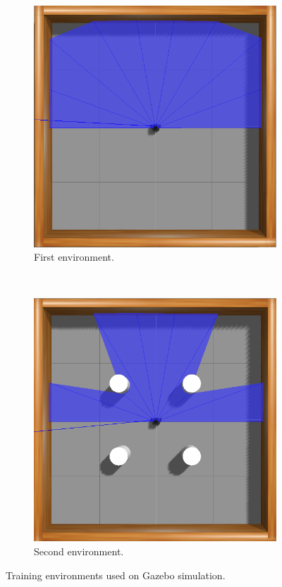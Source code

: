 \begin{figure}[H]
    \centering
    \begin{subfigure}[b]{0.3\textwidth}
        \includegraphics[width=\textwidth]{images/amb1.png}
        \caption{First environment.}
        \label{subfig:env1}
    \end{subfigure}
    ~ %
    \begin{subfigure}[b]{0.3\textwidth}
        \includegraphics[width=\textwidth]{images/amb2.png}
        \caption{Second environment.}
        \label{subfig:env2}
    \end{subfigure}
    \caption{Training environments used on Gazebo simulation.}\label{fig:environments}
\end{figure}

